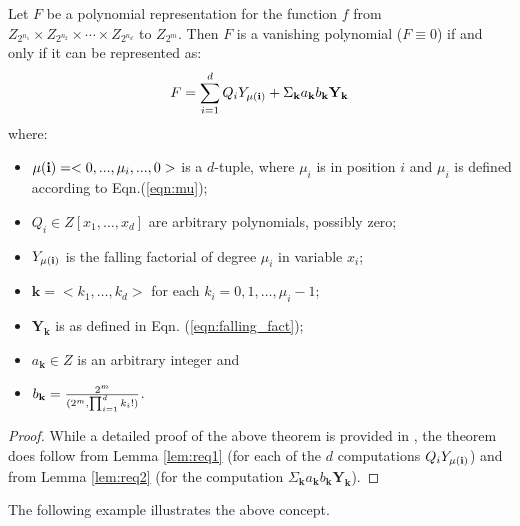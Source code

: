 \begin{theorem}\label{th:red1}
Let $F$ be a polynomial representation for the function $f$ from
$Z_{2^{n_1}} \times Z_{2^{n_2}} \times \cdots \times Z_{2^{n_d}}$ to
$Z_{2^m}$. Then $F$ is a vanishing polynomial ($F \equiv 0$) if and
only if it can be represented as:
\vspace{-0.1in}
\begin{equation} \label{eq:red2}
F = \sum _{i=1}^d Q_i Y_{\bf \mu(i)} +
\Sigma_{\textbf{k}}a_\textbf{k}b_\textbf{k}\textbf{Y}_\textbf{k} 
\end{equation}
where:
\begin{itemize}
\item ${\bf \mu(i)} = <0,...,\mu_i, ...,0>$ is a $d$-tuple, where
  $\mu_i$ is in position $i$ and  $\mu_i$ is defined according to
  Eqn.(\ref{eqn:mu});  
\item $Q_i \in Z[x_1, \ldots, x_d]$ are arbitrary polynomials,
  possibly zero; 
\item $Y_{\bf \mu(i)}$  is the falling factorial of degree $\mu_i$ in
  variable $x_i$; 
\item $\textbf{k} = <k_1, \ldots, k_d>$ for each $k_i = 0, 1, \ldots,
      \mu_i-1$; 
\item $\textbf{Y}_\textbf{k}$ is as defined in Eqn. (\ref{eqn:falling_fact});
\item  $a_\textbf{k} \in Z$ is an arbitrary integer and 
\item $b_\textbf{k}  = {{2^m} \over {(2^m,\prod_{i=1}^{d}k_i!)}}$. 
\end{itemize}
\end{theorem}

\begin{proof}
While a detailed proof of the above theorem is provided in
\cite{chen_96},  the theorem does follow from Lemma \ref{lem:req1} (for
each of the $d$ computations $Q_i Y_{\bf \mu(i)}$) and from Lemma
\ref{lem:req2} (for the computation
$\Sigma_{\textbf{k}}a_\textbf{k}b_\textbf{k}\textbf{Y}_\textbf{k} $).  
\end{proof}

The following example illustrates the above concept.


